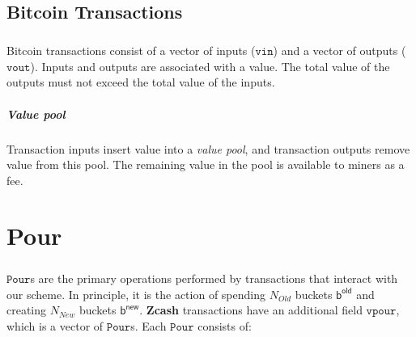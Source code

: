 \documentclass[8pt]{article}
\newcommand{\Zcash}{\textbf{Zcash} }
\newcommand{\Pour}{\mathtt{Pour}}
\newcommand{\vpour}{\mathtt{vpour}}
\newcommand{\Nold}{N_{Old}}
\newcommand{\Nnew}{N_{New}}
\newcommand{\bOld}[1]{\mathsf{b_{#1}^{old}}}
\newcommand{\bNew}[1]{\mathsf{b_{#1}^{new}}}
\begin{document}
\subsection{Bitcoin Transactions}

\subparagraph{}

Bitcoin transactions consist of a vector of inputs ($\mathtt{vin}$) and a vector of outputs ($\mathtt{vout}$). Inputs and outputs are associated with a value. The total value of the outputs must not exceed the total value of the inputs.

\subparagraph{Value pool}

Transaction inputs insert value into a \textit{value pool}, and transaction outputs remove value from this pool. The remaining value in the pool is available to miners as a fee.

\section{Pour}

\subparagraph{}

$\Pour$s are the primary operations performed by transactions that interact with our scheme. In principle, it is the action of spending $\Nold$ buckets $\bOld{}$ and creating $\Nnew$ buckets $\bNew{}$. \Zcash transactions have an additional field $\vpour$, which is a vector of $\Pour$s. Each $\Pour$ consists of:
\end{document}
